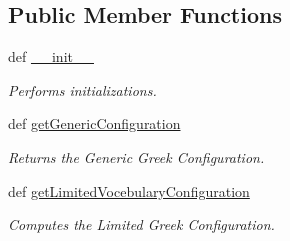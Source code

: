 \subsection*{Public Member Functions}
\begin{DoxyCompactItemize}
\item 
def \hyperlink{classrapp__speech__detection__sphinx4_1_1greek__support_1_1GreekSupport_a11ade953742b11f592db3fdee75d97c1}{\-\_\-\-\_\-init\-\_\-\-\_\-}
\begin{DoxyCompactList}\small\item\em Performs initializations. \end{DoxyCompactList}\item 
def \hyperlink{classrapp__speech__detection__sphinx4_1_1greek__support_1_1GreekSupport_a829373d5fda0c238f8a0b799e380a766}{get\-Generic\-Configuration}
\begin{DoxyCompactList}\small\item\em Returns the Generic Greek Configuration. \end{DoxyCompactList}\item 
def \hyperlink{classrapp__speech__detection__sphinx4_1_1greek__support_1_1GreekSupport_aaf3225dba3273dbd5fd7b01944e20289}{get\-Limited\-Vocebulary\-Configuration}
\begin{DoxyCompactList}\small\item\em Computes the Limited Greek Configuration. \end{DoxyCompactList}\end{DoxyCompactItemize}
